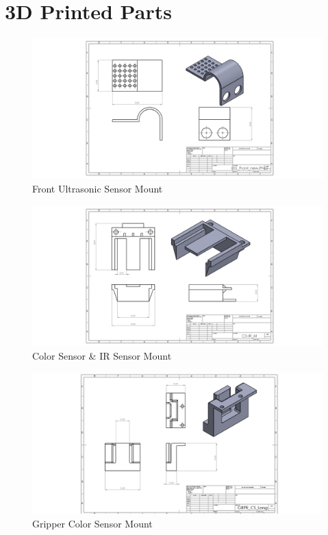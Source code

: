 \documentclass[12pt]{report}
\begin{document}
\section{3D Printed Parts}
\begin{figure}[H]
    \centering
    \includegraphics[width=1\textwidth]{Images/3D prints/USS_Front_new.PNG}
    \caption{Front Ultrasonic Sensor Mount}
    \label{fig:USS_front}
\end{figure}
\begin{figure}[H]
    \centering
    \includegraphics[width=1\textwidth]{Images/3D prints/CS-IR_M_new.PNG}
    \caption{Color Sensor \& IR Sensor Mount}
    \label{fig:CS-IR mount}
\end{figure}


\begin{figure}[H]
    \centering
    \includegraphics[width=1\textwidth]{Images/3D prints/GRPR_CS_Long_new.PNG}
    \caption{Gripper Color Sensor Mount}
    \label{fig:GRPR_CS}
\end{figure}
\end{document}
